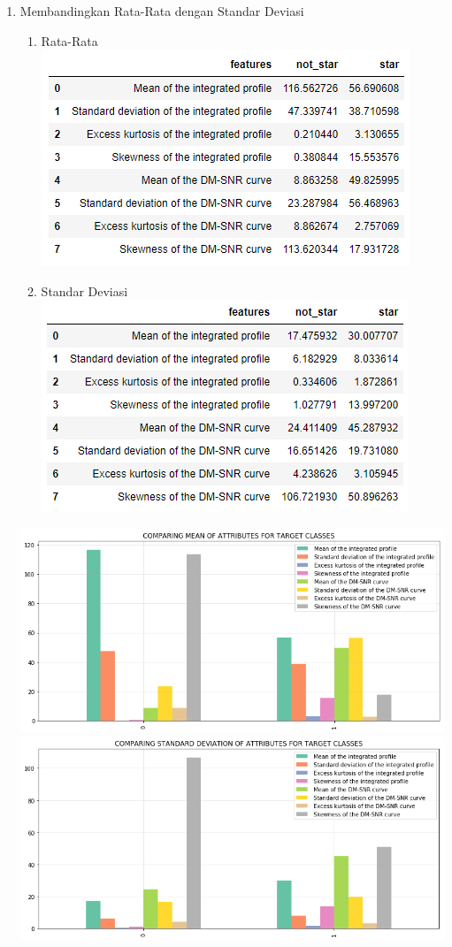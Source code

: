 \documentclass[12pt]{article}
\begin{document}
\begin{enumerate}
        \item Membandingkan Rata-Rata dengan Standar Deviasi
        \begin{enumerate}
        \item Rata-Rata
        \newline \includegraphics[scale=1]{mean-compare.png}
        \newpage
        \item Standar Deviasi
        \newline \includegraphics[scale=1]{std-compare.png}
        \end{enumerate}
        \includegraphics[scale=0.475]{mean-compare-2.png}
        \newline \includegraphics[scale=0.475]{std-compare-2.png}

\end{enumerate}
\end{document}
